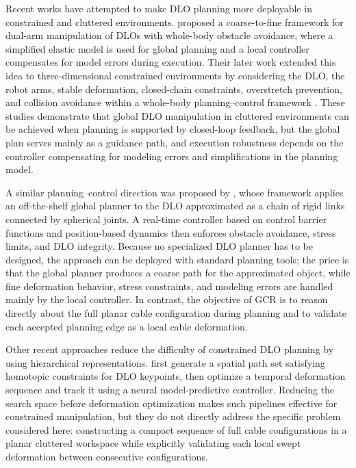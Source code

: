 \documentclass{pas}
\begin{document}
Recent works have attempted to make DLO planning more deployable in
constrained and cluttered environments. \citet{yu2023coarse} proposed a coarse-to-fine framework for dual-arm manipulation of DLOs with whole-body obstacle avoidance, where a simplified elastic model is used for global planning and a local controller compensates for model errors during execution. Their later work extended this idea to three-dimensional constrained environments by considering the DLO, the robot arms, stable deformation, closed-chain constraints, overstretch prevention, and collision avoidance within a whole-body planning--control framework \citep{yu2025generalizable}. These studies demonstrate that global DLO manipulation in cluttered environments can be achieved when planning is supported by closed-loop feedback, but the global plan serves mainly as a guidance path, and execution robustness depends on the controller compensating for modeling errors and simplifications in the planning
model.

A similar planning--control direction was proposed by
\citet{AksoyWen2025DLOPlanningControl}, whose framework applies an off-the-shelf
global planner to the DLO approximated as a chain of rigid links connected by
spherical joints. A real-time controller based on control barrier functions and
position-based dynamics then enforces obstacle avoidance, stress limits, and DLO
integrity. Because no specialized DLO planner has to be designed, the approach
can be deployed with standard planning tools; the price is that the global
planner produces a coarse path for the approximated object, while fine
deformation behavior, stress constraints, and modeling errors are handled mainly
by the local controller. In contrast, the objective of GCR is to
reason directly about the full planar cable configuration during planning and to
validate each accepted planning edge as a local cable deformation.

Other recent approaches reduce the difficulty of constrained DLO planning by
using hierarchical representations. \citet{tang2026hierarchical} first generate
a spatial path set satisfying homotopic constraints for DLO keypoints, then
optimize a temporal deformation sequence and track it using a neural
model-predictive controller. Reducing the search space before deformation
optimization makes such pipelines effective for constrained manipulation, but
they do not directly address the specific problem considered here: constructing
a compact sequence of full cable configurations in a planar cluttered workspace
while explicitly validating each local swept deformation between consecutive
configurations.
\end{document}
